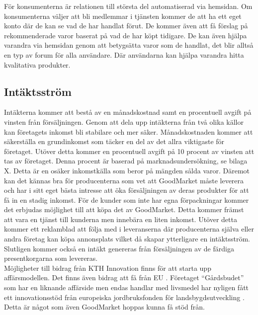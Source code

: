 \documentclass[10pt,a4paper,oneside]{article}
\begin{document}
För konsumenterna är relationen till största del automatiserad via hemsidan. Om konsumenterna väljer att bli medlemmar i tjänsten kommer de att ha ett eget konto där de kan se vad de har handlat förut. De kommer även att få förslag på rekommenderade varor baserat på vad de har köpt tidigare. De kan även hjälpa varandra via hemsidan genom att betygsätta varor som de handlat, det blir alltså en typ av forum för alla användare. Där användarna kan hjälpa varandra hitta kvalitativa produkter. 


\subsection{Intäktsström}
Intäkterna kommer att bestå av en månadskostnad samt en procentuell avgift på vinsten från försäljningen. Genom att dela upp intäkterna från två olika källor kan företagets inkomst bli stabilare och mer säker. Månadskostnaden kommer att säkerställa en grundinkomst som täcker en del av det allra viktigaste för företaget. Utöver detta kommer en procentuell avgift på 10 procent av vinsten att tas av företaget. Denna procent är baserad på marknadsundersökning, se bilaga X. Detta är en osäker inkomstkälla som beror på mängden sålda varor. Däremot kan det kännas bra för producenterna som vet att GoodMarket måste leverera och har i sitt eget bästa intresse att öka försäljningen av deras produkter för att få in en stadig inkomst. För de kunder som inte har egna förpackningar kommer det erbjudas möjlighet till att köpa det av GoodMarket. Detta kommer främst att vara en tjänst till kunderna men innebära en liten inkomst. Utöver detta kommer ett reklamblad att följa med i leveranserna där producenterna själva eller andra företag kan köpa annonsplats vilket då skapar ytterligare en intäktsström. Slutligen kommer också en intäkt genereras från försäljningen av de färdiga presentkorgarna som levereras. \\

Möjligheter till bidrag från KTH Innovation finns för att starta upp affärsmodellen. Det finns även bidrag att få från EU \cite{EU}. Företaget “Gårdsbudet” som har en liknande affärside men endas handlar med livsmedel har nyligen fått ett innovationsstöd från europeiska jordbruksfonden för landsbygdsutveckling \cite{Gårdsbudet4}. Detta är något som även GoodMarket hoppas kunna få stöd från.  
\end{document}
